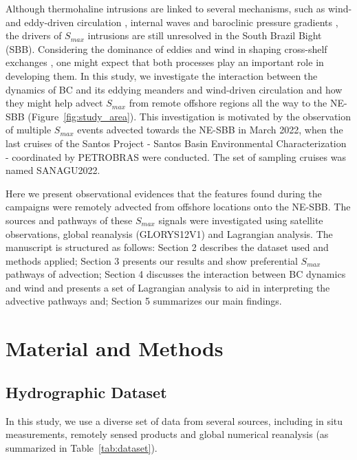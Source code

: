 \documentclass[draft]{agujournal2019}
\begin{document}
Although thermohaline intrusions are linked to several mechanisms, such as wind- and eddy-driven circulation \cite{Gawarkiewicz1990,GonzalezPola2007,Ruiz2019,Li2012,Malan2020,silver2023increased}, internal waves \cite{Hopkins2012} and baroclinic pressure gradients \cite{Posmentier1978FineFront,Aikman1984}, the drivers of \textit{$S_{max}$} intrusions are still unresolved in the South Brazil Bight (SBB). Considering the dominance of eddies and wind in shaping cross-shelf exchanges \cite{combes2021circulation,calil2021,combes2023circulation}, one might expect that both processes play an important role in developing them. In this study, we investigate the interaction between the dynamics of BC and its eddying meanders and wind-driven circulation and how they might help advect \textit{$S_{max}$} from remote offshore regions all the way to the NE-SBB (Figure~\ref{fig:study_area}). This investigation is motivated by the observation of multiple \textit{$S_{max}$} events advected towards the NE-SBB in March 2022, when the last cruises of the Santos Project - Santos Basin Environmental Characterization - coordinated by PETROBRAS \cite{moreira2023multidisciplinary} were conducted. The set of sampling cruises was named SANAGU2022.

Here we present observational evidences that the features found during the campaigns were remotely advected from offshore locations onto the NE-SBB. The sources and pathways of these \textit{$S_{max}$} signals were investigated using satellite observations, global reanalysis (GLORYS12V1) and Lagrangian analysis. The manuscript is structured as follows: Section 2 describes the dataset used and methods applied; Section 3 presents our results and show preferential \textit{$S_{max}$} pathways of advection; Section 4 discusses the interaction between BC dynamics and wind and presents a set of Lagrangian analysis to aid in interpreting the advective pathways and; Section 5 summarizes our main findings. 

\section{Material and Methods}
\label{section:methods}

\subsection{Hydrographic Dataset}
\label{subsec:hydro_dataset}
In this study, we use a diverse set of data from several sources, including in situ measurements, remotely sensed products and global numerical reanalysis (as summarized in Table~\ref{tab:dataset}). 
\end{document}
